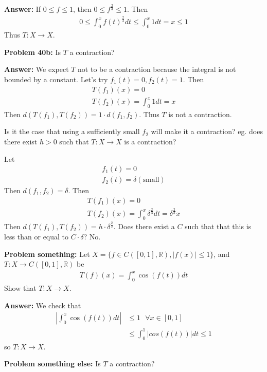 \documentclass{article}
\newcommand*{\txt}[1]{\text{ #1 }}%
\newcommand*{\fora}{\txt{}\forall}%
\newcommand*{\rr}{\mathbb{R}}%
\begin{document}
\textbf{Answer:} If $0\leq f\leq 1$, then $0\leq f^{\frac{2}{3}}\leq 1$. Then \begin{align*}
    0\leq \int_{0}^{x}f(t)^{\frac{2}{3}}dt\leq \int_{0}^{x}1dt=x\leq 1
\end{align*} Thus $T:X\to X$.

\textbf{Problem 40b:} Is $T$ a contraction?

\textbf{Answer:} We expect $T$ not to be a contraction because the integral is not bounded by a constant. Let's try $f_1(t)=0,f_2(t)=1$. Then \begin{align*}
    T(f_1)(x)=0\\
    T(f_2)(x)=\int_{0}^{x}1dt=x
\end{align*} Then $d(T(f_1),T(f_2))=1\cdot d(f_1,f_2)$. Thus $T$ is not a contraction.

Is it the case that using a sufficiently small $f_2$ will make it a contraction? eg. does there exist $h>0$ such that $T:X\to X$ is a contraction?

Let \begin{align*}
    f_1(t)=0\\
    f_2(t)=\delta (\text{small})
\end{align*} Then $d(f_1,f_2)=\delta$. Then \begin{align*}
    T(f_1)(x)=0\\
    T(f_2)(x)=\int_{0}^{x}\delta^{\frac{2}{3}}dt=\delta^{\frac{2}{3}}x
\end{align*} Then $d(T(f_1),T(f_2))=h\cdot \delta^\frac{2}{3}$. Does there exist a $C$ such that that this is less than or equal to $C\cdot \delta$? No. 

\textbf{Problem something:} Let $X=\{f\in C([0,1],\rr),|f(x)|\leq 1\}$, and $T:X\to C([0,1],\rr)$ be \begin{align*}
    T(f)(x)=\int_{0}^{x}\cos(f(t))dt
\end{align*} Show that $T:X\to X$.

\textbf{Answer:} We check that \begin{align*}
    |\int_{0}^{x}\cos(f(t))dt|&\leq 1\fora x\in[0,1]\\
    &\leq \int_{0}^{1}|cos(f(t))|dt\leq 1
\end{align*} so $T:X\to X$.

\textbf{Problem something else:} Is $T$ a contraction?
\end{document}
